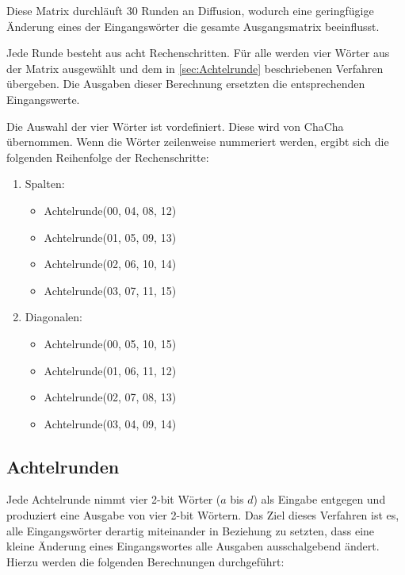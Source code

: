 \documentclass[10pt,a4paper]{article}
\begin{document}
Diese Matrix durchläuft 30 Runden an Diffusion, wodurch eine geringfügige Änderung eines der Eingangswörter die gesamte Ausgangsmatrix beeinflusst.

\medskip
Jede Runde besteht aus acht Rechenschritten.
Für alle werden vier Wörter aus der Matrix ausgewählt und dem in \autoref{sec:Achtelrunde} beschriebenen Verfahren übergeben.
Die Ausgaben dieser Berechnung ersetzten die entsprechenden Eingangswerte.

Die Auswahl der vier Wörter ist vordefiniert.
Diese wird von ChaCha übernommen\cite{Bernstein2008}.
Wenn die Wörter zeilenweise nummeriert werden, ergibt sich die folgenden Reihenfolge der Rechenschritte:
\begin{enumerate}
    \item Spalten:
          \begin{itemize}
              \item Achtelrunde(00, 04, 08, 12)
              \item Achtelrunde(01, 05, 09, 13)
              \item Achtelrunde(02, 06, 10, 14)
              \item Achtelrunde(03, 07, 11, 15)
          \end{itemize}
    \item Diagonalen:
          \begin{itemize}
              \item Achtelrunde(00, 05, 10, 15)
              \item Achtelrunde(01, 06, 11, 12)
              \item Achtelrunde(02, 07, 08, 13)
              \item Achtelrunde(03, 04, 09, 14)
          \end{itemize}
\end{enumerate}

\subsection{Achtelrunden}
\label{sec:Achtelrunde}

Jede Achtelrunde nimmt vier 2-bit Wörter ($a$ bis $d$) als Eingabe entgegen und produziert eine Ausgabe von vier 2-bit Wörtern.
Das Ziel dieses Verfahren ist es, alle Eingangswörter derartig miteinander in Beziehung zu setzten, dass eine kleine Änderung eines Eingangswortes alle Ausgaben ausschalgebend ändert.
Hierzu werden die folgenden Berechnungen durchgeführt:
\end{document}
